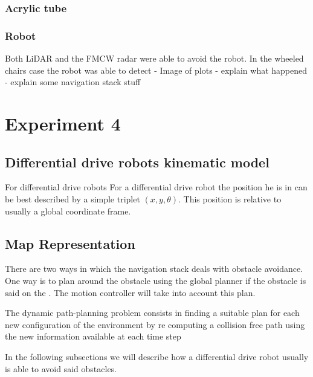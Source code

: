 \subsubsection{Acrylic tube}

\subsubsection{Robot}


Both \ac{LiDAR} and the FMCW radar were able to avoid the robot. 
In the wheeled chairs case the robot was able to detect 
- Image of plots
- explain what happened
- explain some navigation stack stuff

\section {Experiment 4}

\begin{commment}
\subsection{Differential drive robots kinematic model}
For differential drive robots 
For a differential drive robot the position he is in can be best described by a simple triplet $(x,y,\theta)$. This position is relative to usually a  global coordinate frame. 
\subsection{Map Representation}



There are two ways in which the navigation stack deals with obstacle avoidance. One way is to plan around the obstacle using the global planner if the obstacle is said on the .
The motion controller will take into account this plan. 



The dynamic path-planning problem consists in finding a suitable plan for each new configuration of the environment by re computing a collision free path using the new information available at each time step

In the following subsections we will describe how a differential drive robot usually is able to avoid  said obstacles. 
\end{commment}